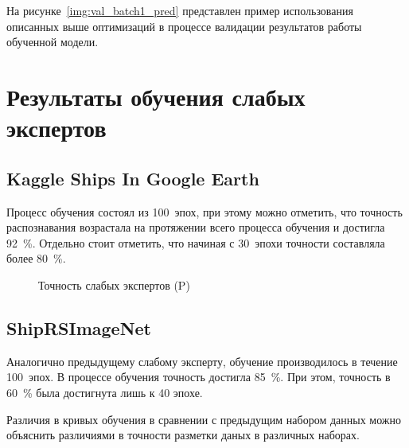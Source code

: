 На рисунке~\ref{img:val_batch1_pred} представлен пример использования описанных выше оптимизаций в процессе валидации результатов работы обученной модели.


\section{Результаты обучения слабых экспертов}

\subsection*{Kaggle Ships In Google Earth}

Процесс обучения состоял из 100~эпох, при этому можно отметить, что точность распознавания возрастала на протяжении всего процесса обучения и достигла 92~\%. Отдельно стоит отметить, что начиная с 30~эпохи точности составляла более 80~\%.


\begin{figure}[htp]
	\centering
	\captionsetup{justification=centering}
	\caption{Точность слабых экспертов (P)}
	\label{plt:precision}
\end{figure}

\subsection*{ShipRSImageNet}

Аналогично предыдущему слабому эксперту, обучение производилось в течение 100~эпох. В процессе обучения точность достигла 85~\%. При этом, точность в 60~\% была достигнута лишь к 40 эпохе.

Различия в кривых обучения в сравнении с предыдущим набором данных можно объяснить различиями в точности разметки даных в различных наборах.

